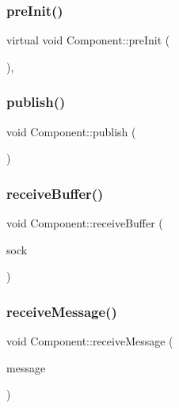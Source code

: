 \mbox{\label{classComponent_a9e6d270061f52a3b42e9d2b0fd8f65c2}} 
\subsubsection{\texorpdfstring{pre\+Init()}{preInit()}}
{\footnotesize\ttfamily virtual void Component\+::pre\+Init (\begin{DoxyParamCaption}{ }\end{DoxyParamCaption})\hspace{0.3cm}{\ttfamily [inline]}, {\ttfamily [virtual]}}

\mbox{\label{classComponent_a22b96395923537ce1a56692fdd971749}} 
\subsubsection{\texorpdfstring{publish()}{publish()}}
{\footnotesize\ttfamily void Component\+::publish (\begin{DoxyParamCaption}{ }\end{DoxyParamCaption})}

\mbox{\label{classComponent_a9f81ad79e0243e6e52ae04b26e6657ab}} 
\subsubsection{\texorpdfstring{receive\+Buffer()}{receiveBuffer()}}
{\footnotesize\ttfamily void Component\+::receive\+Buffer (\begin{DoxyParamCaption}\item[{\hyperlink{structcubiumClientSocket__t}{cubium\+Client\+Socket\+\_\+t} $\ast$}]{sock }\end{DoxyParamCaption})}

\mbox{\label{classComponent_a3142ee952db05b1352f539d446f63934}} 
\subsubsection{\texorpdfstring{receive\+Message()}{receiveMessage()}}
{\footnotesize\ttfamily void Component\+::receive\+Message (\begin{DoxyParamCaption}\item[{\hyperlink{structSpaMessage}{Spa\+Message} $\ast$}]{message }\end{DoxyParamCaption})}

